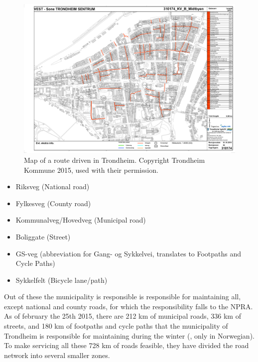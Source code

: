 \begin{landscape}
\begin{figure}[thbp]
    \centerline{\includegraphics[height=0.945\textwidth]{figures/Routes/PreExisting/310174.pdf}}
    \caption{Map of a route driven in Trondheim. Copyright Trondheim Kommune 2015, used with their permission.}
    \label{fig:map_KV_B_used}
\end{figure}
\end{landscape}

\begin{itemize}
    \item Riksveg (National road)
    \item Fylkesveg (County road)
    \item Kommunalveg/Hovedveg (Municipal road)
    \item Boliggate (Street)
    \item GS-veg (abbreviation for Gang- og Sykkelvei, translates to Footpaths and Cycle Paths) %
    \item Sykkelfelt (Bicycle lane/path)
\end{itemize}


Out of these the municipality is responsible is responsible for maintaining all, except national and county roads, for which the responsibility falls to the NPRA. As of february the 25th 2015, there are 212 km of municipal roads, 336 km of streets, and 180 km of footpaths and cycle paths that the municipality of Trondheim is responsible for maintaining during the winter (\citep{trondheimKommuneVinterdriftNettside}, only in Norwegian). To make servicing all these 728 km of roads feasible, they have divided the road network into several smaller zones.

